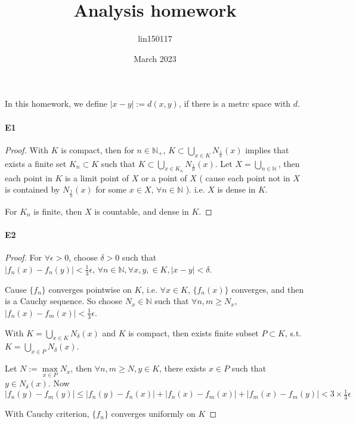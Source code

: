 \documentclass{article}
\title{Analysis homework}
\author{lin150117 }
\date{March 2023}
\begin{document}
In this homework, we define  $ |x-y|:=d(x,y) $, if there is a metrc space with  $ d $.  
\paragraph{E1}
\begin{proof}
    With  $ K  $ is compact, then for  $ n\in\mathbb{N }_+ $,  $ K\subset \bigcup\limits_{x\in K }N_{\frac{1 }{n } }(x)  $ implies that exists a finite set  $ K_n \subset K  $ such that  $ K\subset \bigcup\limits_{x\in K_n }N_{\frac{1}{n}}(x) $.
    Let  $ X=\bigcup\limits_{n\in\mathbb{N }} $, then each point in  $ K  $ is a limit point of  $ X  $ or a point of  $ X  $  ( cause each point not in  $ X  $  is contained by  $ N_{\frac{1 }{n }}(x) $ for some  $ x\in X  $,  $ \forall n\in \mathbb{N } $  ). i.e.  $ X  $ is dense in  $ K  $.

    For  $ K_n  $ is finite, then  $ X  $ is countable, and dense in  $ K  $.
\end{proof}
\paragraph{E2}
\begin{proof}
    For  $ \forall \epsilon>0 $, choose  $ \delta>0  $ such that  $ |f_n(x)-f_n(y)|<\frac{1 }{3}\epsilon,\,\forall n\in \mathbb{N },\forall x,y,\in K, |x-y|<\delta  $.

    Cause  $ \{f_n \} $ converges pointwise on  $ K $, i.e.  $ \forall x\in K  $,  $ \{f_n(x)\} $ converges, and then is a Cauchy sequence.
    So choose $ N_x\in \mathbb{N } $ such that  $ \forall n,m\geqslant N_x  $,  $ |f_n(x)-f_m(x)|<\frac{1}{3}\epsilon $.
    
    With  $ K=\bigcup\limits_{x\in K }N_\delta(x) $ and  $ K  $ is compact, then exists finite subset  $ P \subset K $, s.t.
     $ K=\bigcup\limits_{x\in P}N_\delta(x) $.
     
    Let  $ N:=\max\limits_{x\in P }N_x  $,  then  $ \forall n,m\geqslant N, y\in K $, there exists  $ x\in P  $ such that  $ y\in N_\delta(x) $. Now  $ |f_n(y)-f_m(y)| \leqslant |f_n(y)-f_n(x)|+|f_n(x)-f_m(x)|+|f_m(x)-f_m(y)| <3\times\frac{1}{3}\epsilon $   

    With Cauchy criterion,  $ \{f_n \} $ converges uniformly on  $ K $ 
\end{proof}
\end{document}
